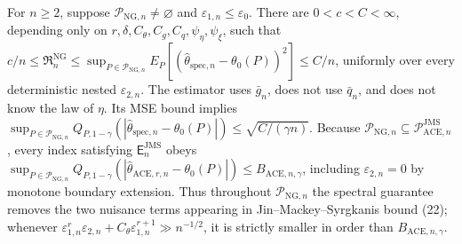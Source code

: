 For \(n\ge2\), suppose \(\mathcal P_{\mathrm{NG},n}\neq\varnothing\) and \(\varepsilon_{1,n}\le\varepsilon_0\). There are \(0<c<C<\infty\), depending only on \(r,\delta,C_{\theta},C_g,C_q,\psi_{\eta},\psi_{\xi}\), such that \(c/n\le\mathfrak R_n^{\mathrm{NG}}\le\sup_{P\in\mathcal P_{\mathrm{NG},n}}E_P[(\widehat\theta_{\mathrm{spec},n}-\theta_0(P))^2]\le C/n\), uniformly over every deterministic nested \(\varepsilon_{2,n}\). The estimator uses \(\bar g_n\), does not use \(\bar q_n\), and does not know the law of \(\eta\). Its MSE bound implies \(\sup_{P\in\mathcal P_{\mathrm{NG},n}}Q_{P,1-\gamma}(|\widehat\theta_{\mathrm{spec},n}-\theta_0(P)|)\le\sqrt{C/(\gamma n)}\). Because \(\mathcal P_{\mathrm{NG},n}\subseteq\mathcal P_{\mathrm{ACE},n}^{\mathrm{JMS}}\), every index satisfying \(\mathsf E_n^{\mathrm{JMS}}\) obeys \(\sup_{P\in\mathcal P_{\mathrm{NG},n}}Q_{P,1-\gamma}(|\widehat\theta_{\mathrm{ACE},r,n}-\theta_0(P)|)\le B_{\mathrm{ACE},n,\gamma}\), including \(\varepsilon_{2,n}=0\) by monotone boundary extension. Thus throughout \(\mathcal P_{\mathrm{NG},n}\) the spectral guarantee removes the two nuisance terms appearing in Jin--Mackey--Syrgkanis bound (22); whenever \(\varepsilon_{1,n}^r\varepsilon_{2,n}+C_{\theta}\varepsilon_{1,n}^{r+1}\gg n^{-1/2}\), it is strictly smaller in order than \(B_{\mathrm{ACE},n,\gamma}\).